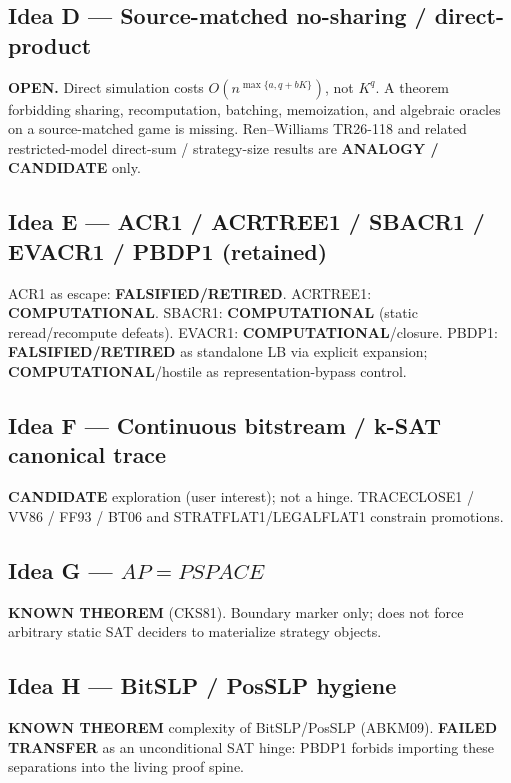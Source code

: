 \documentclass[11pt]{article}
\begin{document}
\subsection*{Idea D --- Source-matched no-sharing / direct-product}
\textbf{OPEN.} Direct simulation costs $O(n^{\max\{a,q+bK\}})$, not $K^q$.
A theorem forbidding sharing, recomputation, batching, memoization, and algebraic oracles
on a source-matched game is missing. Ren--Williams TR26-118 and related restricted-model
direct-sum / strategy-size results are \textbf{ANALOGY / CANDIDATE} only.

\subsection*{Idea E --- ACR1 / ACRTREE1 / SBACR1 / EVACR1 / PBDP1 (retained)}
ACR1 as escape: \textbf{FALSIFIED/RETIRED}.
ACRTREE1: \textbf{COMPUTATIONAL}.
SBACR1: \textbf{COMPUTATIONAL} (static reread/recompute defeats).
EVACR1: \textbf{COMPUTATIONAL}/closure.
PBDP1: \textbf{FALSIFIED/RETIRED} as standalone LB via explicit expansion;
\textbf{COMPUTATIONAL}/hostile as representation-bypass control.

\subsection*{Idea F --- Continuous bitstream / k-SAT canonical trace}
\textbf{CANDIDATE} exploration (user interest); not a hinge. TRACECLOSE1 / VV86 / FF93 / BT06
and STRATFLAT1/LEGALFLAT1 constrain promotions.

\subsection*{Idea G --- $AP=PSPACE$}
\textbf{KNOWN THEOREM} (CKS81). Boundary marker only; does not force arbitrary static SAT
deciders to materialize strategy objects.

\subsection*{Idea H --- BitSLP / PosSLP hygiene}
\textbf{KNOWN THEOREM} complexity of BitSLP/PosSLP (ABKM09). \textbf{FAILED TRANSFER}
as an unconditional SAT hinge: PBDP1 forbids importing these separations into the living proof spine.
\end{document}
